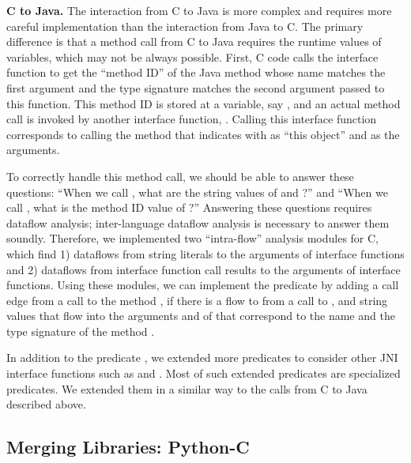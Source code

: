 \textbf{C to Java.} The interaction from C to Java is more complex and
requires more careful implementation than the interaction from Java to C.
The primary difference is that a method call from C to Java requires
the runtime values of variables, which may not be always possible.
First, C code calls the interface function 
to get the ``method ID'' of the Java method whose name matches the first argument
and the type signature matches the second argument passed to this function.
This method ID is stored at a variable, say , and
an actual method call is invoked by another
interface function, . Calling this interface 
function corresponds to calling the method that  indicates
with  as ``this object'' and  as the arguments.

To correctly handle this method call, we should be able to answer these
questions: ``When we call ,
what are the string values of  and ?'' and
``When we call , what is the method ID value of ?''
Answering these questions requires dataflow analysis;
inter-language dataflow analysis is necessary to answer them soundly.
Therefore, we implemented two ``intra-flow'' analysis modules for C,
which find 1) dataflows from string literals to the arguments of interface functions
and 2) dataflows from interface function call results to the arguments of interface functions.
Using these modules, we can implement the
predicate  by adding a call edge from a 
call to the method , if there is a flow to  from a
call to , and string values that flow into the
arguments  and  of  that
correspond to the name and the type signature of the method .

In addition to the predicate ,
we extended more predicates to consider other JNI interface functions such as
 and .
Most of such extended predicates are specialized  predicates.
We extended them in a similar way to the calls from C to Java described above.

\subsection{Merging Libraries: Python-C}\label{sec:merging2}

